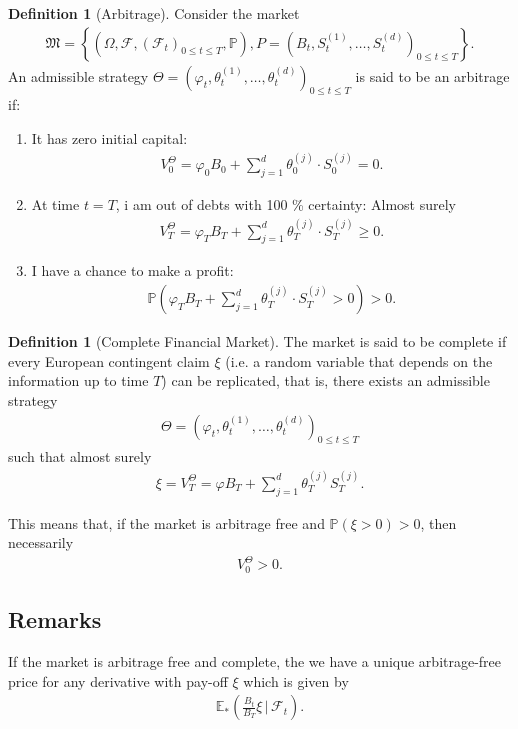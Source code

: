 \documentclass{article}
\theoremstyle{definition}
\newtheorem{definition}[theorem]{Definition}
\numberwithin{equation}{section}
\begin{document}
\begin{definition}[Arbitrage]
    Consider the market
    \begin{align}
        \mathfrak{M} =
        \left\{
            \left(
                \Omega, 
                \mathscr{F}, 
                \left(
                    \mathscr{F}_t
                \right)_{0 \leq t \leq T},
                \mathbb{P}
            \right),
            P =
            \left(
                B_t,
                S_t^{(1)},
                \ldots,
                S_t^{(d)}
            \right)_{0 \leq t \leq T}
        \right\}.
    \end{align}
    An admissible strategy $\Theta = \left(\varphi_t, \theta_t^{(1)}, \ldots, \theta_t^{(d)}\right)_{0 \leq t \leq T}$ is said to be an arbitrage if:
    \begin{enumerate}
        \item It has zero initial capital:
        \begin{align}
            V_0^\Theta = \varphi_0B_0 + \sum_{j = 1}^d\theta_0^{(j)} \cdot S_0^{(j)} = 0.
        \end{align}
        \item At time $t = T$, i am out of debts with 100 \% certainty: Almost surely
        \begin{align}
            V_T^\Theta = \varphi_T B_T + \sum_{j = 1}^d\theta_T^{(j)} \cdot S_T^{(j)} \geq 0.
        \end{align}
        \item I have a chance to make a profit:
        \begin{align}
            \mathbb{P}
            \left(
                \varphi_TB_T + \sum_{j = 1}^d \theta_T^{(j)} \cdot S_T^{(j)} > 0
            \right) > 0.
        \end{align}
    \end{enumerate}
\end{definition}
\begin{definition}[Complete Financial Market]
    The market is said to be complete if every European contingent claim $\xi$ (i.e. a random variable that depends on the information up to time $T$) can be replicated, that is, there exists an admissible strategy
    \begin{align}
        \Theta = \left(\varphi_t, \theta_t^{(1)}, \ldots, \theta_t^{(d)}\right)_{0 \leq t \leq T}
    \end{align}
    such that almost surely
    \begin{align}
        \xi = V_T^{\Theta} = \varphi B_T + \sum_{j = 1}^d \theta_T^{(j)}S_T^{(j)}.
    \end{align}
\end{definition}
This means that, if the market is arbitrage free and $\mathbb{P}\left(\xi > 0\right) > 0$, then necessarily
\begin{align}
    V_0^\Theta > 0.
\end{align}

\subsection{Remarks}
If the market is arbitrage free and complete, the we have a unique arbitrage-free price for any derivative with pay-off $\xi$ which is given by
\begin{align}
    \mathbb{E}_*\left(\frac{B_t}{B_T}\xi\,\bigg|\,\mathscr{F}_t\right).
\end{align}
\end{document}
